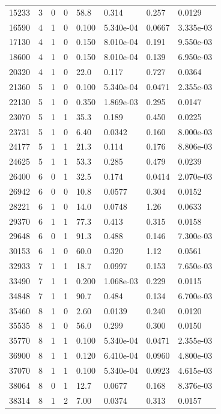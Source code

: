 \documentclass[preview]{standalone}
\begin{document}
{{\begin{tabular}{L{1.2cm}C{1.2cm} C{0.3cm}C{0.5cm} C{1.4cm}C{1.4cm} C{1.4cm}C{1.4cm}}
  15233  &     3  & 0     &  0 &  58.8  & 0.314  & 0.257 &  0.0129   \\ 
  16590  &     4  & 1     &  0 &  0.100  & 5.340e-04  & 0.0667 &  3.335e-03   \\ 
  17130  &     4  & 1     &  0 &  0.150  & 8.010e-04  & 0.191 &  9.550e-03   \\ 
  18600  &     4  & 1     &  0 &  0.150  & 8.010e-04  & 0.139 &  6.950e-03   \\ 
  20320  &     4  & 1     &  0 &  22.0  & 0.117  & 0.727 &  0.0364   \\ 
  21360  &     5  & 1     &  0 &  0.100  & 5.340e-04  & 0.0471 &  2.355e-03   \\ 
  22130  &     5  & 1     &  0 &  0.350  & 1.869e-03  & 0.295 &  0.0147   \\ 
  23070  &     5  & 1     &  1 &  35.3  & 0.189  & 0.450 &  0.0225   \\ 
  23731  &     5  & 1     &  0 &  6.40  & 0.0342  & 0.160 &  8.000e-03   \\ 
  24177  &     5  & 1     &  1 &  21.3  & 0.114  & 0.176 &  8.806e-03   \\ 
  24625  &     5  & 1     &  1 &  53.3  & 0.285  & 0.479 &  0.0239   \\ 
  26400  &     6  & 0     &  1 &  32.5  & 0.174  & 0.0414 &  2.070e-03   \\ 
  26942  &     6  & 0     &  0 &  10.8  & 0.0577  & 0.304 &  0.0152   \\ 
  28221  &     6  & 1     &  0 &  14.0  & 0.0748  & 1.26 &  0.0633   \\ 
  29370  &     6  & 1     &  1 &  77.3  & 0.413  & 0.315 &  0.0158   \\ 
  29648  &     6  & 0     &  1 &  91.3  & 0.488  & 0.146 &  7.300e-03   \\ 
  30153  &     6  & 1     &  0 &  60.0  & 0.320  & 1.12 &  0.0561   \\ 
  32933  &     7  & 1     &  1 &  18.7  & 0.0997  & 0.153 &  7.650e-03   \\ 
  33490  &     7  & 1     &  1 &  0.200  & 1.068e-03  & 0.229 &  0.0115   \\ 
  34848  &     7  & 1     &  1 &  90.7  & 0.484  & 0.134 &  6.700e-03   \\ 
  35460  &     8  & 1     &  0 &  2.60  & 0.0139  & 0.240 &  0.0120   \\ 
  35535  &     8  & 1     &  0 &  56.0  & 0.299  & 0.300 &  0.0150   \\ 
  35770  &     8  & 1     &  1 &  0.100  & 5.340e-04  & 0.0471 &  2.355e-03   \\ 
  36900  &     8  & 1     &  1 &  0.120  & 6.410e-04  & 0.0960 &  4.800e-03   \\ 
  37070  &     8  & 1     &  1 &  0.100  & 5.340e-04  & 0.0923 &  4.615e-03   \\ 
  38064  &     8  & 0     &  1 &  12.7  & 0.0677  & 0.168 &  8.376e-03   \\ 
  38314  &     8  & 1     &  2 &  7.00  & 0.0374  & 0.313 &  0.0157   \\ 
\hline 
\end{tabular} 

}}
\end{document}
